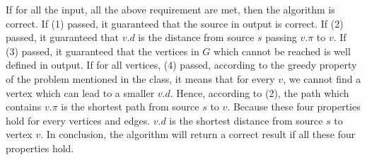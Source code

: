 \documentclass[12pt,letterpaper]{article}
\begin{document}
If for all the input, all the above requirement are met, then the algorithm is correct. If (1) passed, it guaranteed that the source in output is correct. If (2) passed, it guaranteed that $v.d$ is the distance from source $s$ passing $v.\pi$ to $v$. If (3) passed, it guaranteed that the vertices in $G$ which cannot be reached is well defined in output. If for all vertices, (4) passed, according to the greedy property of the problem mentioned in the class, it means that for every $v$, we cannot find a vertex which can lead to a smaller $v.d$. Hence, according to (2), the path which contains $v.\pi$ is the shortest path from source $s$ to $v$. Because these four properties hold for every vertices and edges. $v.d$ is the shortest distance from source $s$ to vertex $v$. In conclusion, the algorithm will return a correct result if all these four properties hold.
\end{document}
